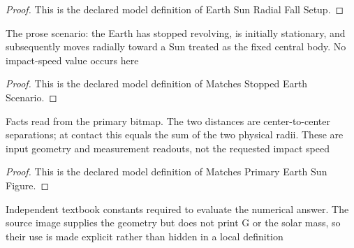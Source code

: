 \begin{proof}
  This is the declared model definition of Earth Sun Radial Fall Setup.
\end{proof}
\begin{definition}
  \label{def:physics:phyx-mini-0708:phyxminiproblems-problemphyxmini0708-matchesstoppedearthscenario}
  The prose scenario: the Earth has stopped revolving, is initially stationary, and subsequently moves radially toward a Sun treated as the fixed central body. No impact-speed value occurs here
\end{definition}
\begin{proof}
  This is the declared model definition of Matches Stopped Earth Scenario.
\end{proof}
\begin{definition}
  \label{def:physics:phyx-mini-0708:phyxminiproblems-problemphyxmini0708-matchesprimaryearthsunfigure}
  Facts read from the primary bitmap. The two distances are center-to-center separations; at contact this equals the sum of the two physical radii. These are input geometry and measurement readouts, not the requested impact speed
\end{definition}
\begin{proof}
  This is the declared model definition of Matches Primary Earth Sun Figure.
\end{proof}
\begin{definition}
  \label{def:physics:phyx-mini-0708:phyxminiproblems-problemphyxmini0708-usestextbooksolarparameters}
  Independent textbook constants required to evaluate the numerical answer. The source image supplies the geometry but does not print G or the solar mass, so their use is made explicit rather than hidden in a local definition
\end{definition}
